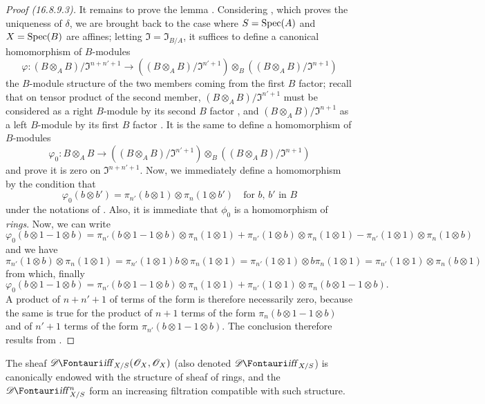 \begin{proof}[Proof (16.8.9.3)]
It remains to prove the lemma .
Considering , which proves the uniqueness of $\delta$, we are brought back to the case where $S = \operatorname{Spec}(A)$ and $X = \operatorname{Spec}(B)$ are affines;
letting $\mathfrak{I} = \mathfrak{I}_{B/A}$, it suffices to define a canonical homomorphism of $B$-modules
\[
  \varphi: (B \otimes_A B)/\mathfrak{I}^{n+n'+1} \to ((B \otimes_A B)/\mathfrak{I}^{n' + 1}) \otimes_B ((B \otimes_A B)/\mathfrak{I}^{n + 1})
\]
the $B$-module structure of the two members coming from the first $B$ factor;
recall that on tensor product of the second member, $(B \otimes_A B)/\mathfrak{I}^{n' + 1}$ must be considered
as a right $B$-module by its second $B$ factor , and $(B \otimes_A B)/\mathfrak{I}^{n + 1}$ as a left $B$-module by its first $B$ factor .
It is the same to define a homomorphism of $B$-modules
\[
  \varphi_0: B \otimes_A B \to ((B \otimes_A B)/\mathfrak{I}^{n' + 1}) \otimes_B ((B \otimes_A B)/\mathfrak{I}^{n + 1})
\]
and prove it is zero on $\mathfrak{I}^{n+n'+1}$.
Now, we immediately define a homomorphism by the condition that
\[
  \varphi_0(b \otimes b') = \pi_{n'}(b \otimes 1) \otimes \pi_n(1 \otimes b') \quad \text{for $b$, $b'$ in $B$}
\]
under the notations of .
Also, it is immediate that $\phi_0$ is a homomorphism of \emph{rings}.
Now, we can write 
\[
  \varphi_0(b \otimes 1 - 1 \otimes b) = \pi_{n'}(b \otimes 1 - 1 \otimes b) \otimes \pi_n(1 \otimes 1) + \pi_{n'}(1 \otimes b) \otimes \pi_n(1 \otimes 1) - \pi_{n'}(1 \otimes 1) \otimes \pi_n(1 \otimes b)
\]
and we have 
\[
  \pi_{n'}(1 \otimes b) \otimes \pi_n(1 \otimes 1) = \pi_{n'}(1 \otimes 1) b \otimes \pi_n(1 \otimes 1) = \pi_{n'}(1 \otimes 1) \otimes b \pi_n(1 \otimes 1) = \pi_{n'}(1 \otimes 1) \otimes \pi_n(b \otimes 1)
\]
from which, finally
\[
  \label{IV.16.8.9.4}
  \varphi_0(b \otimes 1 - 1 \otimes b) = \pi_{n'}(b \otimes 1 - 1 \otimes b) \otimes \pi_n(1 \otimes 1) + \pi_{n'}(1 \otimes 1) \otimes \pi_n(b \otimes 1 - 1 \otimes b). 
  \tag{16.8.9.4}
\]
A product of $n + n' + 1$ of terms of the form  is therefore necessarily zero, because the same is true for the product of $n+1$ terms of the form $\pi_n(b \otimes 1 - 1 \otimes b)$ and of $n' + 1$ terms of the form $\pi_{n'}(b \otimes 1 - 1 \otimes b)$.
The conclusion therefore results from .
\end{proof}

\begin{corollary}[16.8.10]
\label{IV.16.8.10}
The sheaf $\shDiff_{X/S}(\sh{O}_X, \sh{O}_X)$ (also denoted $\shDiff_{X/S}$) is canonically endowed with the structure of sheaf of rings, and the $\shDiff_{X/S}^n$ form an increasing filtration compatible with such structure.
\end{corollary}

